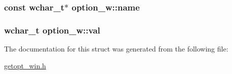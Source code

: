 \subsubsection[{name}]{\setlength{\rightskip}{0pt plus 5cm}const wchar\+\_\+t$\ast$ option\+\_\+w\+::name}\label{structoption__w_a68997974643a31ca2106c35785143411}
\hypertarget{structoption__w_a0613f2e095c1918d8d9f9ace871db1f9}{}
\subsubsection[{val}]{\setlength{\rightskip}{0pt plus 5cm}wchar\+\_\+t option\+\_\+w\+::val}\label{structoption__w_a0613f2e095c1918d8d9f9ace871db1f9}


The documentation for this struct was generated from the following file\+:\begin{DoxyCompactItemize}
\item 
\hyperlink{getopt__win_8h}{getopt\+\_\+win.\+h}\end{DoxyCompactItemize}

